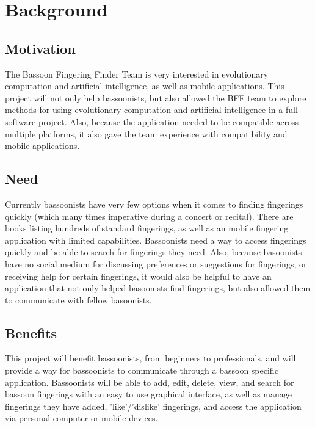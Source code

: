 \documentclass[12pt,english]{article}
\begin{document}
\section{Background}


\subsection{Motivation}

The Bassoon Fingering Finder Team is very interested in evolutionary
computation and artificial intelligence, as well as mobile applications.
This project will not only help bassoonists, but also allowed the
BFF team to explore methods for using evolutionary computation and
artificial intelligence in a full software project. Also, because
the application needed to be compatible across multiple platforms,
it also gave the team experience with compatibility and mobile applications.


\subsection{Need}

Currently bassoonists have very few options when it comes to finding
fingerings quickly (which many times imperative during a concert or
recital). There are books listing hundreds of standard fingerings,
as well as an mobile fingering application with limited capabilities.
Bassoonists need a way to access fingerings quickly and be able to
search for fingerings they need. Also, because basoonists have no
social medium for discussing preferences or suggestions for fingerings,
or receiving help for certain fingerings, it would also be helpful
to have an application that not only helped basoonists find fingerings,
but also allowed them to communicate with fellow basoonists.


\subsection{Benefits}

This project will benefit bassoonists, from beginners to professionals,
and will provide a way for bassoonists to communicate through a bassoon
specific application. Bassoonists will be able to add, edit, delete,
view, and search for bassoon fingerings with an easy to use graphical
interface, as well as manage fingerings they have added, 'like'/'dislike'
fingerings, and access the application via personal computer or mobile
devices.
\end{document}
